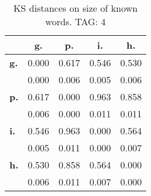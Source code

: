 \begin{table}[h!]
\begin{center}
\begin{tabular}{| l || c | c | c | c |}\hline
 & {\bf g.} & {\bf p.} & {\bf i.} & {\bf h.} \\\hline\hline
{\bf g.} & 0.000 & 0.617 & 0.546 & 0.530 \\
{\bf } & 0.000 & 0.006 & 0.005 & 0.006 \\\hline
{\bf p.} & 0.617 & 0.000 & 0.963 & 0.858 \\
{\bf } & 0.006 & 0.000 & 0.011 & 0.011 \\\hline
{\bf i.} & 0.546 & 0.963 & 0.000 & 0.564 \\
{\bf } & 0.005 & 0.011 & 0.000 & 0.007 \\\hline
{\bf h.} & 0.530 & 0.858 & 0.564 & 0.000 \\
{\bf } & 0.006 & 0.011 & 0.007 & 0.000 \\\hline
\end{tabular}
\caption{KS distances on size of known words. TAG: 4}
\end{center}
\end{table}